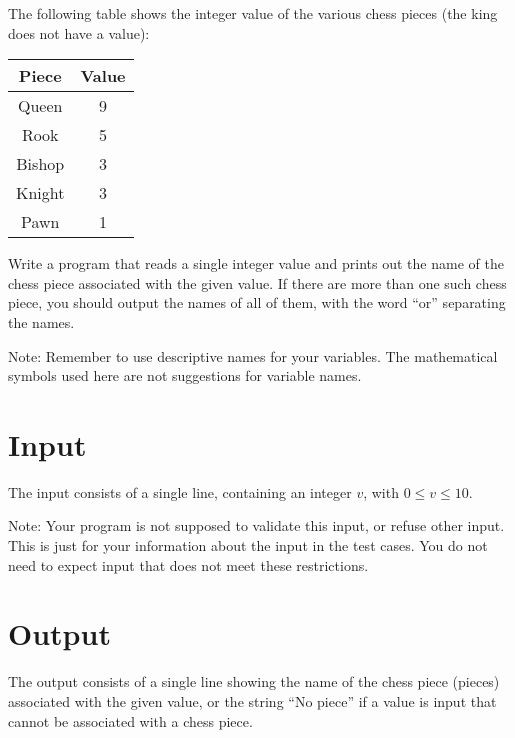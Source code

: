 
The following table shows the integer value of the various chess pieces (the king does not have a value):

\begin{center}
\begin{tabular}{ |c|c| }
\hline
\textbf{Piece} & \textbf{Value} \\ 
\hline
Queen & 9 \\ 
Rook & 5 \\ 
Bishop & 3 \\
Knight & 3 \\
Pawn & 1 \\
\hline
\end{tabular}
\end{center}

Write a program that reads a single integer value and prints out the name of the chess piece associated with the given value. 
If there are more than one such chess piece, you should output the names of all of them, with the word ``or'' separating the names.

Note: Remember to use descriptive names for your variables.
The mathematical symbols used here are not suggestions for variable names.

\section*{Input}
The input consists of a single line, containing an integer $v$, with $0 \leq v \leq 10$.

Note: Your program is not supposed to validate this input, or refuse other input.
This is just for your information about the input in the test cases.
You do not need to expect input that does not meet these restrictions.

\section*{Output}
The output consists of a single line showing the name of the chess piece (pieces) associated with the given value,
or the string ``No piece'' if a value is input that cannot be associated with a chess piece.
